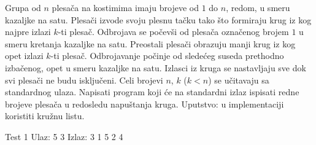 \begin{Exercise}[label=611]
Grupa od $n$ plesača na kostimima imaju brojeve od $1$ do $n$, redom, u smeru kazaljke na satu.
Plesači izvode svoju plesnu tačku tako što formiraju krug iz kog najpre izlazi $k$-ti plesač.
Odbrojava se počevši od plesača označenog brojem $1$ u smeru kretanja kazaljke na satu. 
Preostali plesači obrazuju manji krug iz kog opet izlazi $k$-ti plesač. Odbrojavanje počinje od
sledećeg suseda prethodno izbačenog, opet u smeru kazaljke na satu. Izlasci iz kruga se nastavljaju
sve dok svi plesači ne budu isključeni. 
Celi brojevi $n$, $k$ ($k < n$) se učitavaju sa standardnog ulaza. Napisati program koji će na standardni 
izlaz ispisati redne brojeve plesača u redosledu napuštanja kruga. 
Uputstvo: u implementaciji koristiti kružnu listu.
\begin{maxitest}
  \begin{test}{Test 1}
Ulaz: 5 3 
Izlaz: 3 1 5 2 4
  \end{test}
\end{maxitest}

\end{Exercise}
\begin{Answer}[ref=611]
\end{Answer}




